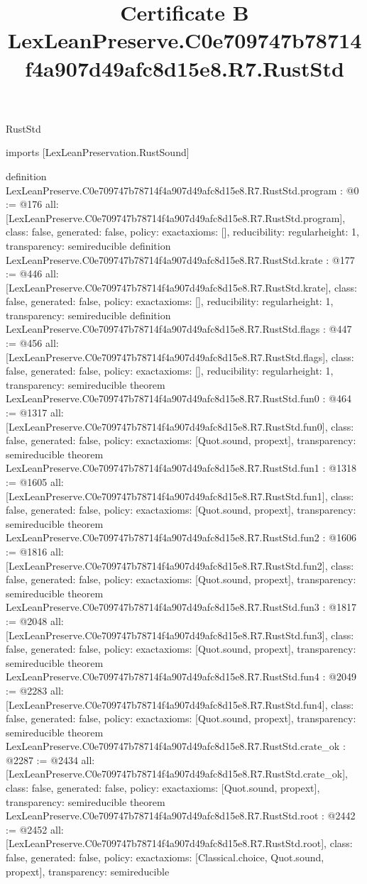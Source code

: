 \begin{lexlean}{RustStd}
\title{Certificate B LexLeanPreserve.C0e709747b78714f4a907d49afc8d15e8.R7.RustStd}
\begin{coremodule}
imports [LexLeanPreservation.RustSound]

definition LexLeanPreserve.C0e709747b78714f4a907d49afc8d15e8.R7.RustStd.program : @0 := @176 {
  all: [LexLeanPreserve.C0e709747b78714f4a907d49afc8d15e8.R7.RustStd.program],
  class: false,
  generated: false,
  policy: exact{axioms: []},
  reducibility: regular{height: 1},
  transparency: semireducible
}
definition LexLeanPreserve.C0e709747b78714f4a907d49afc8d15e8.R7.RustStd.krate : @177 := @446 {
  all: [LexLeanPreserve.C0e709747b78714f4a907d49afc8d15e8.R7.RustStd.krate],
  class: false,
  generated: false,
  policy: exact{axioms: []},
  reducibility: regular{height: 1},
  transparency: semireducible
}
definition LexLeanPreserve.C0e709747b78714f4a907d49afc8d15e8.R7.RustStd.flags : @447 := @456 {
  all: [LexLeanPreserve.C0e709747b78714f4a907d49afc8d15e8.R7.RustStd.flags],
  class: false,
  generated: false,
  policy: exact{axioms: []},
  reducibility: regular{height: 1},
  transparency: semireducible
}
theorem LexLeanPreserve.C0e709747b78714f4a907d49afc8d15e8.R7.RustStd.fun0 : @464 := @1317 {
  all: [LexLeanPreserve.C0e709747b78714f4a907d49afc8d15e8.R7.RustStd.fun0],
  class: false,
  generated: false,
  policy: exact{axioms: [Quot.sound, propext]},
  transparency: semireducible
}
theorem LexLeanPreserve.C0e709747b78714f4a907d49afc8d15e8.R7.RustStd.fun1 : @1318 := @1605 {
  all: [LexLeanPreserve.C0e709747b78714f4a907d49afc8d15e8.R7.RustStd.fun1],
  class: false,
  generated: false,
  policy: exact{axioms: [Quot.sound, propext]},
  transparency: semireducible
}
theorem LexLeanPreserve.C0e709747b78714f4a907d49afc8d15e8.R7.RustStd.fun2 : @1606 := @1816 {
  all: [LexLeanPreserve.C0e709747b78714f4a907d49afc8d15e8.R7.RustStd.fun2],
  class: false,
  generated: false,
  policy: exact{axioms: [Quot.sound, propext]},
  transparency: semireducible
}
theorem LexLeanPreserve.C0e709747b78714f4a907d49afc8d15e8.R7.RustStd.fun3 : @1817 := @2048 {
  all: [LexLeanPreserve.C0e709747b78714f4a907d49afc8d15e8.R7.RustStd.fun3],
  class: false,
  generated: false,
  policy: exact{axioms: [Quot.sound, propext]},
  transparency: semireducible
}
theorem LexLeanPreserve.C0e709747b78714f4a907d49afc8d15e8.R7.RustStd.fun4 : @2049 := @2283 {
  all: [LexLeanPreserve.C0e709747b78714f4a907d49afc8d15e8.R7.RustStd.fun4],
  class: false,
  generated: false,
  policy: exact{axioms: [Quot.sound, propext]},
  transparency: semireducible
}
theorem LexLeanPreserve.C0e709747b78714f4a907d49afc8d15e8.R7.RustStd.crate_ok : @2287 := @2434 {
  all: [LexLeanPreserve.C0e709747b78714f4a907d49afc8d15e8.R7.RustStd.crate_ok],
  class: false,
  generated: false,
  policy: exact{axioms: [Quot.sound, propext]},
  transparency: semireducible
}
theorem LexLeanPreserve.C0e709747b78714f4a907d49afc8d15e8.R7.RustStd.root : @2442 := @2452 {
  all: [LexLeanPreserve.C0e709747b78714f4a907d49afc8d15e8.R7.RustStd.root],
  class: false,
  generated: false,
  policy: exact{axioms: [Classical.choice, Quot.sound, propext]},
  transparency: semireducible
}


\end{coremodule}
\end{lexlean}
